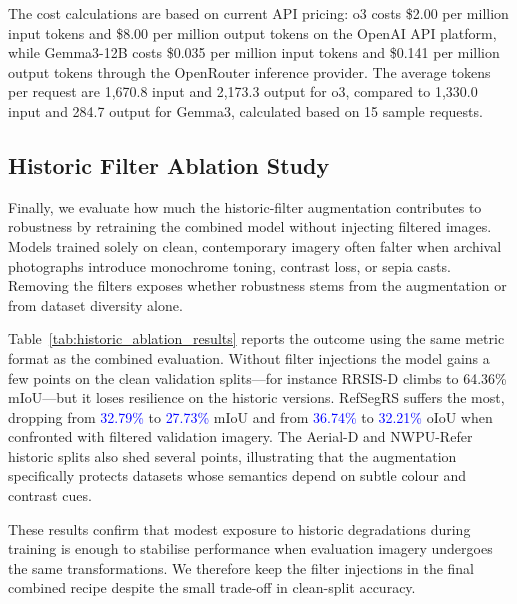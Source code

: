 The cost calculations are based on current API pricing: o3 costs \$2.00 per million input tokens and \$8.00 per million output tokens on the OpenAI API platform, while Gemma3-12B costs \$0.035 per million input tokens and \$0.141 per million output tokens through the OpenRouter inference provider. The average tokens per request are 1,670.8 input and 2,173.3 output for o3, compared to 1,330.0 input and 284.7 output for Gemma3, calculated based on 15 sample requests.

\subsection{Historic Filter Ablation Study}

Finally, we evaluate how much the historic-filter augmentation contributes to robustness by retraining the combined model without injecting filtered images. Models trained solely on clean, contemporary imagery often falter when archival photographs introduce monochrome toning, contrast loss, or sepia casts. Removing the filters exposes whether robustness stems from the augmentation or from dataset diversity alone.

Table~\ref{tab:historic_ablation_results} reports the outcome using the same metric format as the combined evaluation. Without filter injections the model gains a few points on the clean validation splits—for instance RRSIS-D climbs to 64.36\% mIoU—but it loses resilience on the historic versions. RefSegRS suffers the most, dropping from \textcolor{blue}{32.79\%} to \textcolor{blue}{27.73\%} mIoU and from \textcolor{blue}{36.74\%} to \textcolor{blue}{32.21\%} oIoU when confronted with filtered validation imagery. The Aerial-D and NWPU-Refer historic splits also shed several points, illustrating that the augmentation specifically protects datasets whose semantics depend on subtle colour and contrast cues.

These results confirm that modest exposure to historic degradations during training is enough to stabilise performance when evaluation imagery undergoes the same transformations. We therefore keep the filter injections in the final combined recipe despite the small trade-off in clean-split accuracy.

